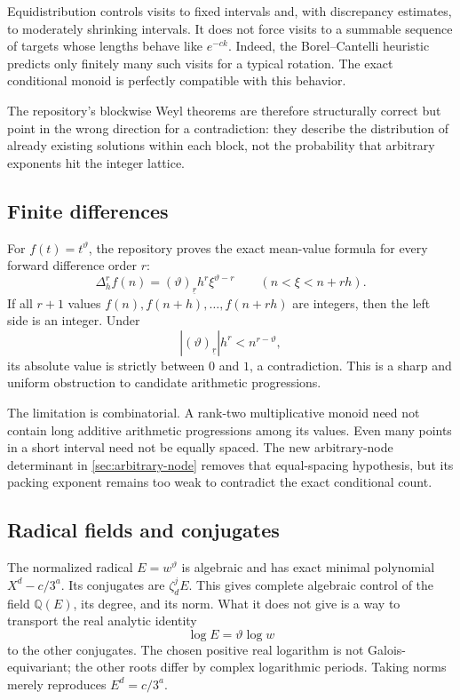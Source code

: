 \documentclass[11pt,oneside]{article}
\theoremstyle{definition}
\theoremstyle{remark}
\newcommand{\Q}{\mathbb Q}
\newcommand{\thetaq}{\vartheta}
\newcommand{\fall}[2]{\left(#1\right)_{\!\underline{#2}}}
\begin{document}
Equidistribution controls visits to fixed intervals and, with discrepancy estimates, to
moderately shrinking intervals.  It does not force visits to a summable sequence of targets
whose lengths behave like $e^{-ck}$.  Indeed, the Borel--Cantelli heuristic predicts only
finitely many such visits for a typical rotation.  The exact conditional monoid is perfectly
compatible with this behavior.

The repository's blockwise Weyl theorems are therefore structurally correct but point in the
wrong direction for a contradiction: they describe the distribution of already existing
solutions within each block, not the probability that arbitrary exponents hit the integer
lattice.

\subsection{Finite differences}

For $f(t)=t^{\thetaq}$, the repository proves the exact mean-value formula for every forward
difference order $r$:
\[
 \Delta_h^r f(n)
 =\fall{\thetaq}{r}h^r\xi^{\thetaq-r}
\qquad(n<\xi<n+rh).
\]
If all $r+1$ values $f(n),f(n+h),\ldots,f(n+rh)$ are integers, then the left side is an
integer.  Under
\[
 |\fall{\thetaq}{r}|h^r<n^{r-\thetaq},
\]
its absolute value is strictly between $0$ and $1$, a contradiction.  This is a sharp and
uniform obstruction to candidate arithmetic progressions.

The limitation is combinatorial.  A rank-two multiplicative monoid need not contain long
additive arithmetic progressions among its values.  Even many points in a short interval need
not be equally spaced.  The new arbitrary-node determinant in \cref{sec:arbitrary-node}
removes that equal-spacing hypothesis, but its packing exponent remains too weak to contradict
the exact conditional count.

\subsection{Radical fields and conjugates}

The normalized radical $E=w^{\thetaq}$ is algebraic and has exact minimal polynomial
$X^d-c/3^a$.  Its conjugates are $\zeta_d^jE$.  This gives complete algebraic control of the
field $\Q(E)$, its degree, and its norm.  What it does not give is a way to transport the real
analytic identity
\[
  \log E=\thetaq\log w
\]
to the other conjugates.  The chosen positive real logarithm is not Galois-equivariant; the
other roots differ by complex logarithmic periods.  Taking norms merely reproduces
$E^d=c/3^a$.
\end{document}
